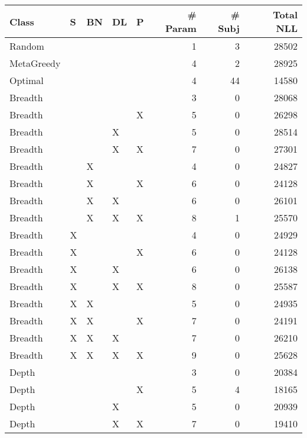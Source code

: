 \begin{tabular}{lllllrrr}
\toprule
      Class &  S & BN & DL &  P &  \# Param &  \# Subj &  Total NLL \\
\midrule
     Random &    &    &    &    &        1 &       3 &      28502 \\
 MetaGreedy &    &    &    &    &        4 &       2 &      28925 \\
    Optimal &    &    &    &    &        4 &      44 &      14580 \\
    Breadth &    &    &    &    &        3 &       0 &      28068 \\
    Breadth &    &    &    &  X &        5 &       0 &      26298 \\
    Breadth &    &    &  X &    &        5 &       0 &      28514 \\
    Breadth &    &    &  X &  X &        7 &       0 &      27301 \\
    Breadth &    &  X &    &    &        4 &       0 &      24827 \\
    Breadth &    &  X &    &  X &        6 &       0 &      24128 \\
    Breadth &    &  X &  X &    &        6 &       0 &      26101 \\
    Breadth &    &  X &  X &  X &        8 &       1 &      25570 \\
    Breadth &  X &    &    &    &        4 &       0 &      24929 \\
    Breadth &  X &    &    &  X &        6 &       0 &      24128 \\
    Breadth &  X &    &  X &    &        6 &       0 &      26138 \\
    Breadth &  X &    &  X &  X &        8 &       0 &      25587 \\
    Breadth &  X &  X &    &    &        5 &       0 &      24935 \\
    Breadth &  X &  X &    &  X &        7 &       0 &      24191 \\
    Breadth &  X &  X &  X &    &        7 &       0 &      26210 \\
    Breadth &  X &  X &  X &  X &        9 &       0 &      25628 \\
      Depth &    &    &    &    &        3 &       0 &      20384 \\
      Depth &    &    &    &  X &        5 &       4 &      18165 \\
      Depth &    &    &  X &    &        5 &       0 &      20939 \\
      Depth &    &    &  X &  X &        7 &       0 &      19410 \\

\end{tabular}
